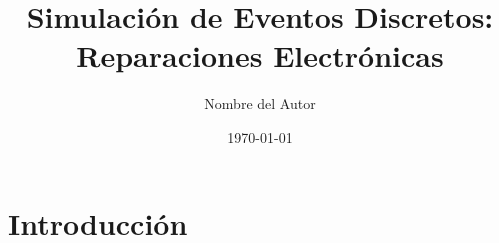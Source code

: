 \documentclass[a4paper,12pt]{article}
\title{Simulación de Eventos Discretos: Reparaciones Electrónicas}
\author{Nombre del Autor}
\date{\today}
\begin{document}
\maketitle

\section{Introducción}
\end{document}
